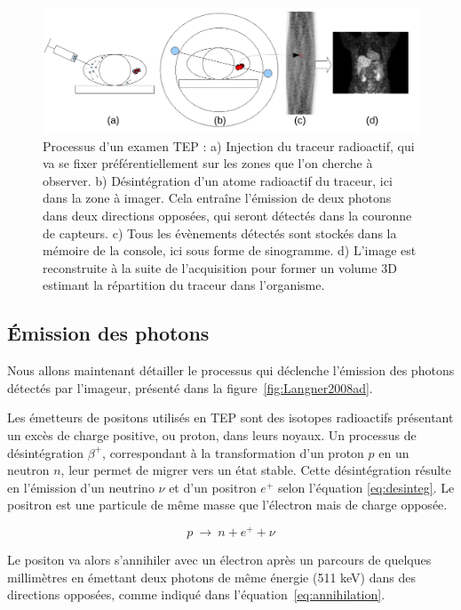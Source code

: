 \begin{figure}
\centering
\includegraphics[width=16cm]{images/schemaTEP}
\caption[Présentation simplifiée de la TEP]{Processus d'un examen TEP : a) Injection du traceur radioactif, qui va se fixer préférentiellement sur les zones que l'on cherche à observer. b) Désintégration d'un atome radioactif du traceur, ici dans la zone à imager. Cela entraîne l'émission de deux photons dans deux directions opposées, qui seront détectés dans la couronne de capteurs. c) Tous les évènements détectés sont stockés dans la mémoire de la console, ici sous forme de sinogramme. d) L'image est reconstruite à la suite de l'acquisition pour former un volume 3D estimant la répartition du traceur dans l'organisme.}
\label{fig:schemaTEP}
\end{figure}

	\subsection{\'Emission des photons}

Nous allons maintenant détailler le processus qui déclenche l'émission des photons détectés par l'imageur, présenté dans la figure~\ref{fig:Langner2008ad}.

Les émetteurs de positons utilisés en TEP sont des isotopes radioactifs présentant un excès de charge positive, ou proton, dans leurs noyaux. Un processus de désintégration $\beta^+$, correspondant à la transformation d’un proton $p$ en un neutron $n$, leur permet de migrer vers un état stable. Cette désintégration résulte en l’émission d’un neutrino $\nu$ et d’un positron $e^+$ selon l’équation \ref{eq:desinteg}. Le positron est une particule de même masse que l’électron mais de charge opposée.

\begin{equation}
 p~\rightarrow~n + e^+ + \nu
\label{eq:desinteg}
\end{equation}

Le positon va alors s'annihiler avec un électron après un parcours de quelques millimètres en émettant deux photons de même énergie (511 keV) dans des directions opposées, comme indiqué dans l'équation~\ref{eq:annihilation}.

